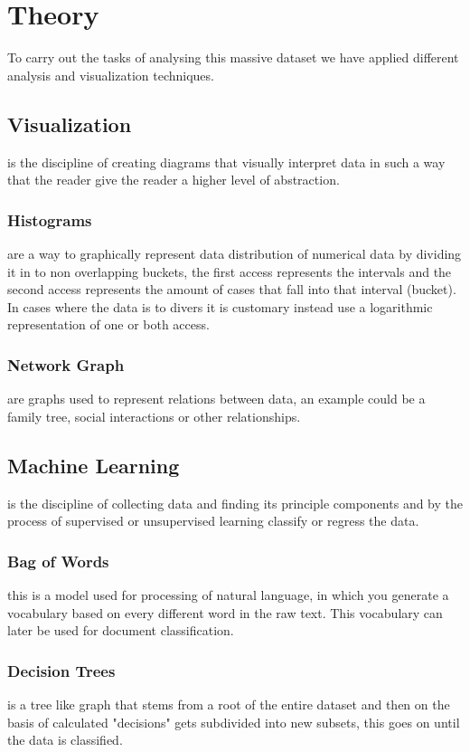 \section{Theory}
To carry out the tasks of analysing this massive dataset we have applied different analysis and visualization techniques.
\subsection{Visualization}
is the discipline of creating diagrams that visually interpret data in such a way that the reader give the reader a higher level of abstraction.
\subsubsection{Histograms}
are a way to graphically represent data distribution of numerical data by dividing it in to non overlapping buckets, the first access represents the intervals and the second access represents the amount of cases that fall into that interval (bucket). In cases where the data is to divers it is customary instead use a logarithmic representation of one or both access.
\subsubsection{Network Graph}
are graphs used to represent relations between data, an example could be a family tree, social interactions or other relationships.
\subsection{Machine Learning}
is the discipline of collecting data and finding its principle components and by the process of supervised or unsupervised learning classify or regress the data.

\subsubsection{Bag of Words}
this is a model used for processing of natural language, in which you generate a vocabulary based on every different word in the raw text. This vocabulary can later be used for document classification. 

\subsubsection{Decision Trees}
is a tree like graph that stems from a root of the entire dataset and then on the basis of calculated "decisions" gets subdivided into new subsets, this goes on until the data is classified.

